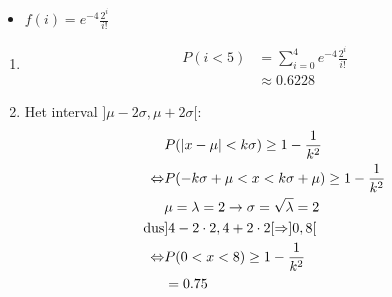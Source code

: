 \documentclass[12pt]{report}
\begin{document}
\begin{itemize}[label={}]
{{\begin{itemize}
            \item {$f(i) = e^{-4}\frac{2^i}{i!}$}
        \end{itemize}
        \begin{enumerate}
         \item 
                \begin{equation*}
                    \begin{split}
                     P(i < 5) & = \sum_{i = 0}^{4}e^{-4}\frac{2^i}{i!}\\
                              & \approx 0.6228
                    \end{split}
                \end{equation*}
         \item
            Het interval $]\mu - 2\sigma, \mu + 2\sigma[$:
            \begin{equation*}
             \begin{split}
              & P(|x -\mu| < k\sigma) \geq 1 - \frac{1}{k^2} \\
               \Leftrightarrow & P(-k\sigma + \mu < x < k\sigma + \mu) \geq 1 - \frac{1}{k^2} \\
               & \mu = \lambda = 2 \rightarrow \sigma = \sqrt{\lambda} = 2 \\
               \hbox{dus} & ]4 - 2\cdot 2, 4 + 2\cdot 2[ \Rightarrow ]0, 8[ \\
               \Leftrightarrow & P(0 < x < 8) \geq 1 - \frac{1}{k^2} \\
                              & = 0.75\\
             \end{split}
            \end{equation*}

        \end{enumerate}

}}
\end{itemize}
\end{document}
